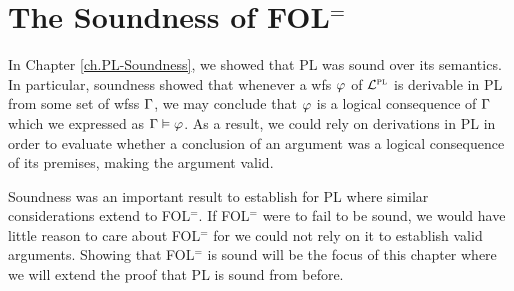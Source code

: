 ﻿%
\chapter{The Soundness of FOL$^=$}
  \label{ch.FOL-soundness}


In Chapter \ref{ch.PL-Soundness}, we showed that PL was sound over its semantics.
In particular, soundness showed that whenever a wfs $\varphi$ of $\mathcal{L}^{\textsc{pl}}$ is derivable in PL from some set of wfss $\Gamma$, we may conclude that $\varphi$ is a logical consequence of $\Gamma$ which we expressed as $\Gamma \vDash \varphi$.
As a result, we could rely on derivations in PL in order to evaluate whether a conclusion of an argument was a logical consequence of its premises, making the argument valid.

Soundness was an important result to establish for PL where similar considerations extend to FOL$^=$.
If FOL$^=$ were to fail to be sound, we would have little reason to care about FOL$^=$ for we could not rely on it to establish valid arguments.
Showing that FOL$^=$ is sound will be the focus of this chapter where we will extend the proof that PL is sound from before.

